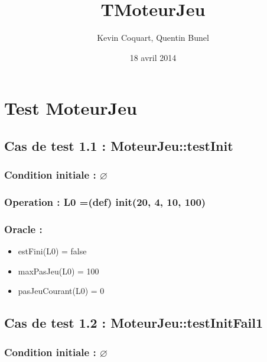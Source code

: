 \documentclass[11pt]{article}
\title{TMoteurJeu}
\author{Kevin Coquart, Quentin Bunel}
\date{18 avril 2014}
\begin{document}
\maketitle

\setcounter{tocdepth}{3}
\tableofcontents
\vspace*{1cm}
\section{Test MoteurJeu}
\label{sec-1}


\subsection{Cas de test 1.1 : MoteurJeu::testInit}
\label{sec-1.1}

\subsubsection{Condition initiale : $\varnothing$}
\label{sec-1.1.1}

\subsubsection{Operation : L0 =(def) init(20, 4, 10, 100)}
\label{sec-1.1.2}

\subsubsection{Oracle :}
\label{sec-1.1.3}

\begin{itemize}

\item estFini(L0) = false\\
\label{sec-1.1.3.1}


\item maxPasJeu(L0) = 100\\
\label{sec-1.1.3.2}


\item pasJeuCourant(L0) = 0\\
\label{sec-1.1.3.3}


\end{itemize} %
\subsection{Cas de test 1.2 : MoteurJeu::testInitFail1}
\label{sec-1.2}

\subsubsection{Condition initiale : $\varnothing$}
\label{sec-1.2.1}
\end{document}
